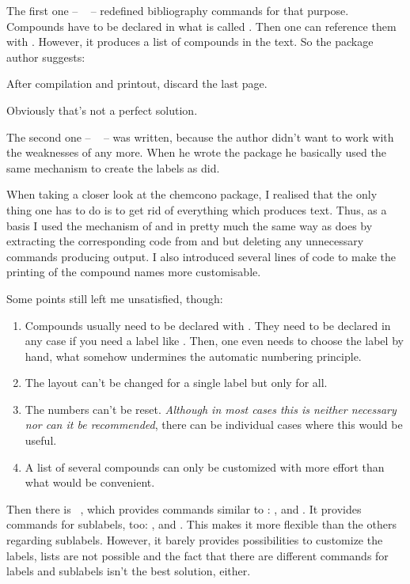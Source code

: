 \documentclass[load-preamble+,babel-options={english,american}]{cnltx-doc}
\begin{document}
The first one -- ~\cite{pkg:chemcono} -- redefined bibliography
commands for that purpose.  Compounds have to be declared in what is called
.  Then one can reference them with .
However, it produces a list of compounds in the text.  So the package author
suggests:
\begin{cnltxquote}
  After compilation and printout, discard the last page.
\end{cnltxquote}
Obviously that's not a perfect solution.

The second one -- ~\cite{pkg:chemcompounds} -- was written,
because the author didn't want to work with the weaknesses of 
any more.  When he wrote the package he basically used the same mechanism to
create the labels as  did.
\begin{cnltxquote}
  When taking a closer look at the chemcono package, I realised that the only
  thing one has to do is to get rid of everything which produces text.  Thus,
  as a basis I used the mechanism of  and  in pretty
  much the same way as  does by extracting the corresponding
  code from  and  but deleting any
  unnecessary commands producing output.  I also introduced several lines of
  code to make the printing of the compound names more customisable.
\end{cnltxquote}
Some points still left me unsatisfied, though:
\begin{enumerate}
  \item Compounds usually need to be declared with
    .  They need to be declared in any case if you need a
    label like .  Then, one even needs to choose the label by
    hand, what somehow undermines the automatic numbering principle.
  \item The layout can't be changed for a single label but only for all.
  \item The numbers can't be reset.  \emph{Although in most cases this is
      neither necessary nor can it be recommended}, there can be individual
    cases where this would be useful.
  \item A list of several compounds  can only be
    customized with more effort than what would be convenient.
\end{enumerate}

Then there is ~\cite{pkg:bpchem}, which provides commands similar
to  : \marg{}, \marg{} and
\marg{}.  It provides commands for sublabels, too:
\marg{}\marg{}, \marg{}\marg{} and
\marg{}\marg{}.  This makes it more flexible than the others
regarding sublabels.  However, it barely provides possibilities to customize
the labels, lists are not possible and the fact that there are different
commands for labels and sublabels isn't the best solution, either.
\end{document}

